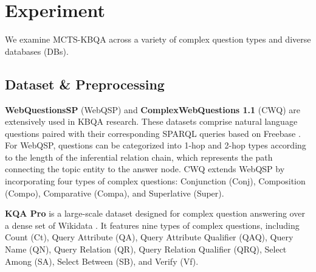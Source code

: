 \section{Experiment}

We examine MCTS-KBQA across a variety of complex question types and diverse databases (DBs).

\subsection{Dataset \& Preprocessing}

\begin{table}
\caption{Statistics of the datasets.}
\label{tab:data_statistics}
\end{table}

\textbf{WebQuestionsSP} (WebQSP) \citep{Yih-Wen-tau-ACL-2016-WebQSP} and \textbf{ComplexWebQuestions 1.1} (CWQ) \citep{Talmor-Alon-NAACL-2018-ComplexWebQuestions-CWQ} are extensively used in KBQA research. These datasets comprise natural language questions paired with their corresponding SPARQL queries based on Freebase \citep{Bollacker-Kurt-SIGMOD-2008-Freebase}. 
For WebQSP, questions can be categorized into 1-hop and 2-hop types according to the length of the inferential relation chain, which represents the path connecting the topic entity to the answer node.
CWQ extends WebQSP by incorporating four types of complex questions: Conjunction (Conj), Composition (Compo), Comparative (Compa), and Superlative (Super).

\textbf{KQA Pro} \citep{Cao-Shulin-ACL-2022-KQAPro} is a large-scale dataset designed for complex question answering over a dense set of Wikidata \citep{Vrandečić-Denny-CACM-2014-Wikidata}. It features nine types of complex questions, including Count (Ct), Query Attribute (QA), Query Attribute Qualifier (QAQ), Query Name (QN), Query Relation (QR), Query Relation Qualifier (QRQ), Select Among (SA), Select Between (SB), and Verify (Vf).


